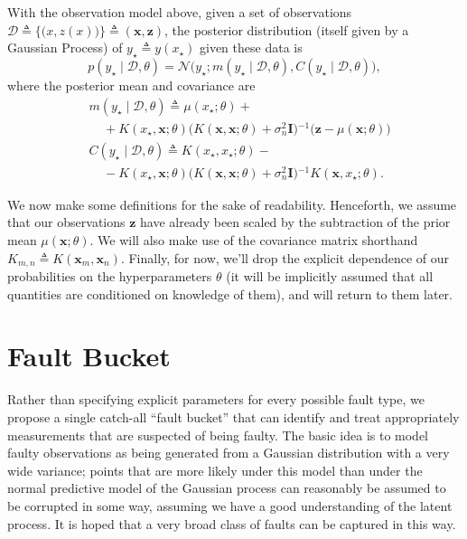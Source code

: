 \documentclass{article}
\newcommand{\deq}{\ensuremath{\triangleq}}
\newcommand{\given}{\ensuremath{\mid}}
\newcommand{\cm}[1]{\ensuremath{\mathcal{#1}}}
\newcommand{\bm}[1]{\ensuremath{\mathbf{#1}}}
\newcommand{\data}{\ensuremath{\cm{D}}}
\newcommand{\inv}{\ensuremath{^{-1}}}
\newcommand{\vect}[1]{\bm{#1}}
\newcommand{\vz}{\vect{z}}
\newcommand{\vx}{\vect{x}}
\newcommand{\mean}[2]{{m}(#1\given#2)}
\newcommand{\cov}[2]{{C}(#1\given#2)}
\newcommand{\st}{_{\star}}
\newcommand{\defequal}{\triangleq}
\begin{document}
With the observation model above, given a set of observations
$
 \data
 \deq
 \bigl\lbrace
   \bigl( x, z(x) \bigr)
 \bigr\rbrace
 \deq
 ( \bm{x}, \bm{z} )
$,
the posterior distribution (itself given by a Gaussian Process) of $y\st \deq y(x\st)$ given these data is
\begin{equation*}
 p(y\st \given \data, \theta)
 =
 \cm{N}
 \bigl(
   y\st;
   \mean{y\st}{\data,\theta},
   \cov{y\st}{\data,\theta}
 \bigr),
\end{equation*}
where the posterior mean and covariance are
\begin{align*}
 &
 \mean{y\st}{\data,\theta}
 \deq
 \mu(x\st; \theta)
 +
 {}
 \\
 &
 \mspace{20mu}
 +
 K(x\st, \bm{x}; \theta)
 \bigl(
 K(\bm{x}, \bm{x}; \theta) + \sigma_n^2 \bm{I}
 \bigr)\inv
 \bigl(
   \bm{z} - \mu(\bm{x}; \theta)
 \bigr)
 \\  
 &
 \cov{y\st}{\data,\theta}
 \deq
 K(x\st, x\st; \theta)
 -
 {}
 \\
 &
 \mspace{20mu}
 -
 K(x\st, \bm{x}; \theta)
 \bigl(
   K(\bm{x}, \bm{x}; \theta) + \sigma_n^2 \bm{I}
 \bigr)\inv
 K(\bm{x}, x\st; \theta).
\end{align*}

We now make some definitions for the sake of readability. Henceforth,
we assume that our observations $\vz$ have already been scaled by the
subtraction of the prior mean $\mu(\bm{x}; \theta)$. We will also make
use of the covariance matrix shorthand $K_{m,n} \defequal
K(\vx_m,\vx_n)$. Finally, for now, we'll drop the explicit dependence
of our probabilities on the hyperparameters $\theta$ (it will be
implicitly assumed that all quantities are conditioned on knowledge of
them), and will return to them later.

\section{Fault Bucket}\label{bucket}

Rather than specifying explicit parameters for every possible fault
type, we propose a single catch-all ``fault bucket'' that can identify
and treat appropriately measurements that are suspected of being
faulty.  The basic idea is to model faulty observations as being
generated from a Gaussian distribution with a very wide variance;
points that are more likely under this model than under the normal
predictive model of the Gaussian process can reasonably be assumed to
be corrupted in some way, assuming we have a good understanding of the
latent process. It is hoped that a very broad class of faults can be
captured in this way.
\end{document}
